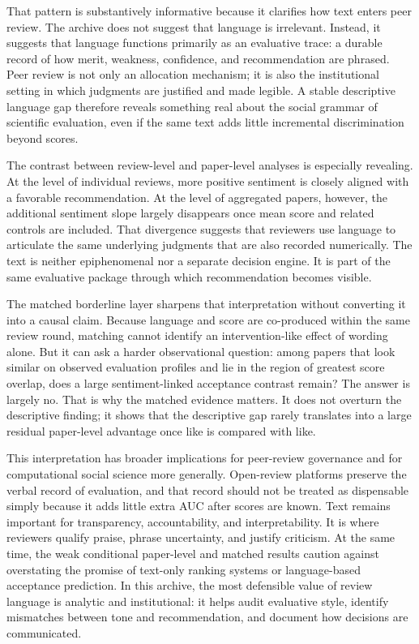 \documentclass[9pt,twocolumn]{pnas-new}
\begin{document}
That pattern is substantively informative because it clarifies how text enters peer review. The archive does not suggest that language is irrelevant. Instead, it suggests that language functions primarily as an evaluative trace: a durable record of how merit, weakness, confidence, and recommendation are phrased. Peer review is not only an allocation mechanism; it is also the institutional setting in which judgments are justified and made legible. A stable descriptive language gap therefore reveals something real about the social grammar of scientific evaluation, even if the same text adds little incremental discrimination beyond scores.

The contrast between review-level and paper-level analyses is especially revealing. At the level of individual reviews, more positive sentiment is closely aligned with a favorable recommendation. At the level of aggregated papers, however, the additional sentiment slope largely disappears once mean score and related controls are included. That divergence suggests that reviewers use language to articulate the same underlying judgments that are also recorded numerically. The text is neither epiphenomenal nor a separate decision engine. It is part of the same evaluative package through which recommendation becomes visible.

The matched borderline layer sharpens that interpretation without converting it into a causal claim. Because language and score are co-produced within the same review round, matching cannot identify an intervention-like effect of wording alone. But it can ask a harder observational question: among papers that look similar on observed evaluation profiles and lie in the region of greatest score overlap, does a large sentiment-linked acceptance contrast remain? The answer is largely no. That is why the matched evidence matters. It does not overturn the descriptive finding; it shows that the descriptive gap rarely translates into a large residual paper-level advantage once like is compared with like.

This interpretation has broader implications for peer-review governance and for computational social science more generally. Open-review platforms preserve the verbal record of evaluation, and that record should not be treated as dispensable simply because it adds little extra AUC after scores are known. Text remains important for transparency, accountability, and interpretability. It is where reviewers qualify praise, phrase uncertainty, and justify criticism. At the same time, the weak conditional paper-level and matched results caution against overstating the promise of text-only ranking systems or language-based acceptance prediction. In this archive, the most defensible value of review language is analytic and institutional: it helps audit evaluative style, identify mismatches between tone and recommendation, and document how decisions are communicated.
\end{document}
